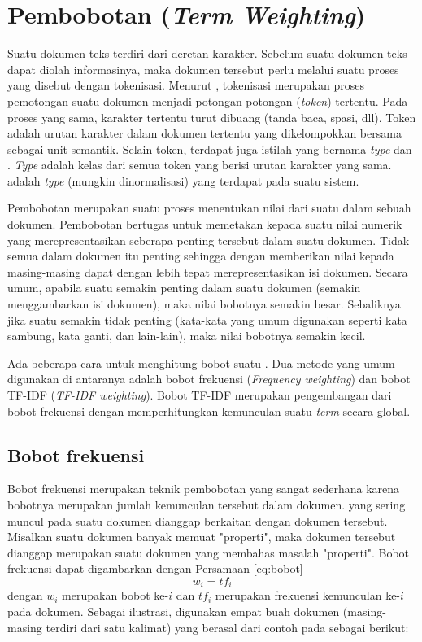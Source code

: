 \section{Pembobotan \Term (\textit{Term Weighting})}
\label{sec:termWeight}
Suatu dokumen teks terdiri dari deretan karakter. Sebelum suatu dokumen teks dapat diolah informasinya, maka dokumen tersebut perlu melalui suatu proses yang disebut dengan tokenisasi. Menurut \cite{schutze2008introduction}, tokenisasi merupakan proses pemotongan suatu dokumen menjadi potongan-potongan (\textit{token}) tertentu. Pada proses yang sama, karakter tertentu turut dibuang (tanda baca, spasi, dll). Token adalah urutan karakter dalam dokumen tertentu yang dikelompokkan bersama sebagai unit semantik. Selain token, terdapat juga istilah yang bernama \textit{type} dan \term. \textit{Type} adalah kelas dari semua token yang berisi urutan karakter yang sama. \Term adalah \textit{type} (mungkin dinormalisasi) yang terdapat pada suatu sistem.

Pembobotan \term merupakan suatu proses menentukan nilai dari suatu \term dalam sebuah dokumen. Pembobotan \term bertugas untuk memetakan \term kepada suatu nilai numerik yang merepresentasikan seberapa penting \term tersebut dalam suatu dokumen. Tidak semua \term dalam dokumen itu penting sehingga dengan memberikan nilai kepada masing-masing \term dapat dengan lebih tepat merepresentasikan isi dokumen. Secara umum, apabila suatu \term semakin penting dalam suatu dokumen (semakin menggambarkan isi dokumen), maka nilai bobotnya semakin besar. Sebaliknya jika suatu \term semakin tidak penting (kata-kata yang umum digunakan seperti kata sambung, kata ganti, dan lain-lain), maka nilai bobotnya semakin kecil.

Ada beberapa cara untuk menghitung bobot suatu \term. Dua metode yang umum digunakan di antaranya adalah bobot frekuensi (\textit{Frequency weighting}) dan bobot TF-IDF (\textit{TF-IDF weighting}). Bobot TF-IDF merupakan pengembangan dari bobot frekuensi dengan memperhitungkan kemunculan suatu \textit{term} secara global.

\subsection{Bobot frekuensi}
\label{sub:freq}
Bobot frekuensi merupakan teknik pembobotan yang sangat sederhana karena bobotnya merupakan jumlah kemunculan \term tersebut dalam dokumen. \Term yang sering muncul pada suatu dokumen dianggap berkaitan dengan dokumen tersebut. Misalkan suatu dokumen banyak memuat \term "properti", maka dokumen tersebut dianggap merupakan suatu dokumen yang membahas masalah "properti". Bobot frekuensi dapat digambarkan dengan Persamaan \ref{eq:bobot}
\begin{equation}
\label{eq:bobot}
w_i=tf_i
\end{equation}
dengan $w_i$ merupakan bobot \term ke-$i$ dan $tf_i$ merupakan frekuensi kemunculan \term ke-$i$ pada dokumen. Sebagai ilustrasi, digunakan empat buah dokumen (masing-masing terdiri dari satu kalimat) yang berasal dari contoh pada \cite{schutze2008introduction} sebagai berikut:


